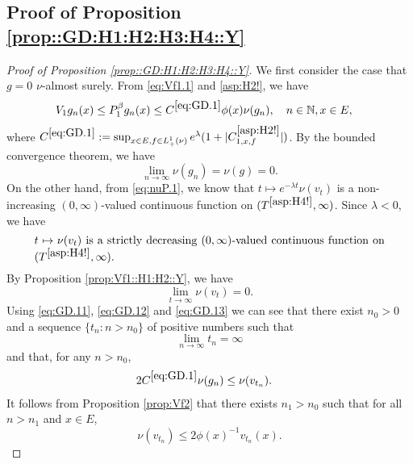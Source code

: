 \documentclass[12pt,a4paper]{amsart}
\numberwithin{equation}{section}
\theoremstyle{plain}
\theoremstyle{definition}
\theoremstyle{remark}
\begin{document}
\subsection{Proof of Proposition \ref{prop::GD:H1:H2:H3:H4::Y}}
\begin{proof}[Proof of Proposition \ref{prop::GD:H1:H2:H3:H4::Y}] \label{sec:GD}
	We first consider the case that $g = 0$ $\nu$-almost surely.
	From \eqref{eq:Vf1.1} and \eqref{asp:H2!}, we have
\begin{align}\label{eq:GD.1}
	&V_1 g_n(x)
	\leq P^\beta_1 g_n(x)
	\leq C^{\eqref{eq:GD.1}} \phi(x) \nu(g_n),
	\quad n \in \mathbb N, x\in E,
\end{align}
	where $C^{\eqref{eq:GD.1}}:= \sup_{x\in E, f\in L_+^1(\nu)}e^{\lambda }(1+|C^{\eqref{asp:H2!}}_{1,x,f}|)$.
	By the bounded convergence theorem, we have
\begin{equation} \label{eq:GD.11}
	\lim_{n\to \infty} \nu(g_n) = \nu(g) = 0.
\end{equation}
	On the other hand, from \eqref{eq:nuP.1}, we know that $ t\mapsto e^{-\lambda t}\nu(v_t)$ is a non-increasing $(0,\infty)$-valued continuous function on $(T^{\eqref{asp:H4!}},\infty)$.
	Since $\lambda <0$, we have
\begin{equation} \label{eq:GD.12}
\begin{minipage}{0.9\textwidth}
	$ t\mapsto \nu(v_t)$ is a strictly decreasing $(0,\infty)$-valued continuous function on $(T^{\eqref{asp:H4!}},\infty)$.
\end{minipage}
\end{equation}
	By Proposition \ref{prop:Vf1::H1:H2::Y}, we have
\begin{equation} \label{eq:GD.13}
	\lim_{t\to \infty}\nu(v_t) =0.
\end{equation}
	Using \eqref{eq:GD.11}, \eqref{eq:GD.12} and \eqref{eq:GD.13} we can see that there exist $n_0>0$ and a sequence $\{t_n: n>n_0\}$ of positive numbers such that
\begin{equation} \label{eq:GD.14}
	\lim_{n\to \infty} t_n = \infty
\end{equation}
	and that, for any $n>n_0$,
\begin{align} \label{eq:GD.2}& 2C^{\eqref{eq:GD.1}} \nu(g_n) \leq \nu(v_{t_n}). \end{align}
	It follows from Proposition \ref{prop:Vf2} that there exists $n_1 > n_0$ such that for all $n>n_1$ and $x\in E$,
\begin{equation} \label{eq:GD.25}
	\nu(v_{t_n})\leq 2\phi(x)^{-1} v_{t_n}(x).
\end{equation}

\end{proof}
\end{document}
